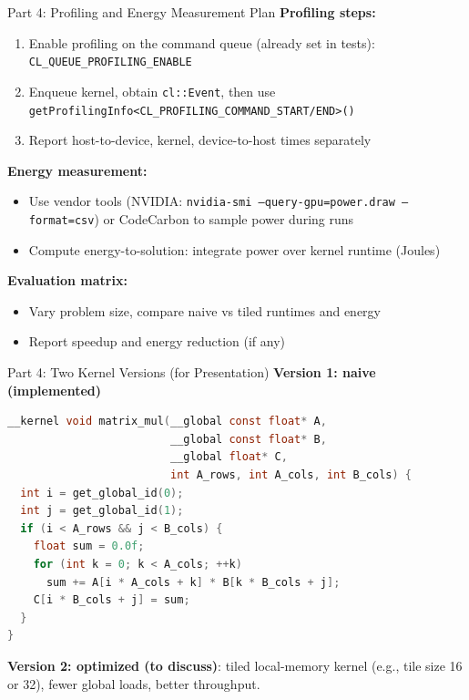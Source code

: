 \documentclass[aspectratio=169]{beamer}
\begin{document}
\begin{frame}{Part 4: Profiling and Energy Measurement Plan}
\textbf{Profiling steps:}
\begin{enumerate}
  \item Enable profiling on the command queue (already set in tests): \texttt{CL\_QUEUE\_PROFILING\_ENABLE}
  \item Enqueue kernel, obtain \texttt{cl::Event}, then use \texttt{getProfilingInfo<CL_PROFILING_COMMAND_START/END>()}
  \item Report host-to-device, kernel, device-to-host times separately
\end{enumerate}

\textbf{Energy measurement:}
\begin{itemize}
  \item Use vendor tools (NVIDIA: \texttt{nvidia-smi --query-gpu=power.draw --format=csv}) or CodeCarbon to sample power during runs
  \item Compute energy-to-solution: integrate power over kernel runtime (Joules)
\end{itemize}

\textbf{Evaluation matrix:}
\begin{itemize}
  \item Vary problem size, compare naive vs tiled runtimes and energy
  \item Report speedup and energy reduction (if any)
\end{itemize}
\end{frame}

\begin{frame}[fragile]{Part 4: Two Kernel Versions (for Presentation)}
\textbf{Version 1: naive (implemented)}
\begin{lstlisting}[language=C]
__kernel void matrix_mul(__global const float* A,
                         __global const float* B,
                         __global float* C,
                         int A_rows, int A_cols, int B_cols) {
  int i = get_global_id(0);
  int j = get_global_id(1);
  if (i < A_rows && j < B_cols) {
    float sum = 0.0f;
    for (int k = 0; k < A_cols; ++k)
      sum += A[i * A_cols + k] * B[k * B_cols + j];
    C[i * B_cols + j] = sum;
  }
}
\end{lstlisting}

\textbf{Version 2: optimized (to discuss)}: tiled local-memory kernel (e.g., tile size 16 or 32), fewer global loads, better throughput.
\end{frame}
\end{document}
